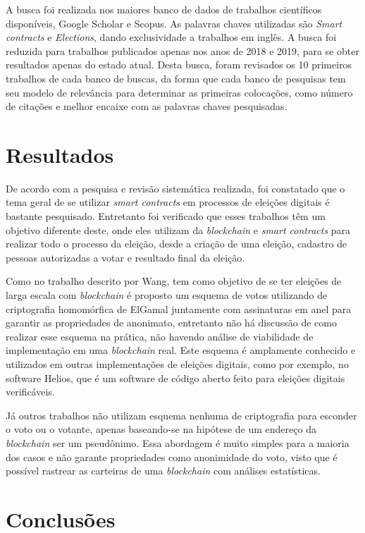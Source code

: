 \documentclass{ufsctex/ufsctex}
\begin{document}
A busca foi realizada nos maiores banco de dados de trabalhos científicos
disponíveis, Google Scholar e Scopus. As palavras chaves utilizadas são
\textit{Smart contracts} e \textit{Elections}, dando exclusividade a trabalhos
em inglês. A busca foi reduzida para trabalhos publicados apenas nos anos de
2018 e 2019, para se obter resultados apenas do estado atual. Desta busca,
foram revisados os 10 primeiros trabalhos de cada banco de buscas, da forma que
cada banco de pesquisas tem seu modelo de relevância para determinar as
primeiras colocações, como número de citações e melhor encaixe com as palavras
chaves pesquisadas.

\section{Resultados}

De acordo com a pesquisa e revisão sistemática realizada, foi constatado que o
tema geral de se utilizar \textit{smart contracts} em processos de eleições
digitais é bastante pesquisado. Entretanto foi verificado que esses trabalhos
têm um objetivo diferente deste, onde eles utilizam da \textit{blockchain} e
\textit{smart contracts} para realizar todo o processo da eleição, desde a
criação de uma eleição, cadastro de pessoas autorizadas a votar e resultado
final da eleição.

Como no trabalho descrito por Wang, tem como objetivo de se ter eleições de
larga escala com \textit{blockchain} é proposto um esquema de votos utilizando
de criptografia homomórfica de ElGamal juntamente com assinaturas em anel para
garantir as propriedades de anonimato, entretanto não há discussão de como
realizar esse esquema na prática, não havendo análise de viabilidade de
implementação em uma \textit{blockchain} real. \cite{WANG2018234} Este esquema
é amplamente conhecido e utilizados em outras implementações de eleições
digitais, como por exemplo, no software Helios, que é um software de código
aberto feito para eleições digitais verificáveis.

Já outros trabalhos não utilizam esquema nenhuma de criptografia para esconder
o voto ou o votante, apenas baseando-se na hipótese de um endereço da
\textit{blockchain} ser um pseudônimo. \cite{Yavuz2018} Essa abordagem é muito
simples para a maioria dos casos e não garante propriedades como anonimidade do
voto, visto que é possível rastrear as carteiras de uma \textit{blockchain} com
análises estatísticas. \cite{Kosy2014}


\section{Conclusões}
\end{document}
